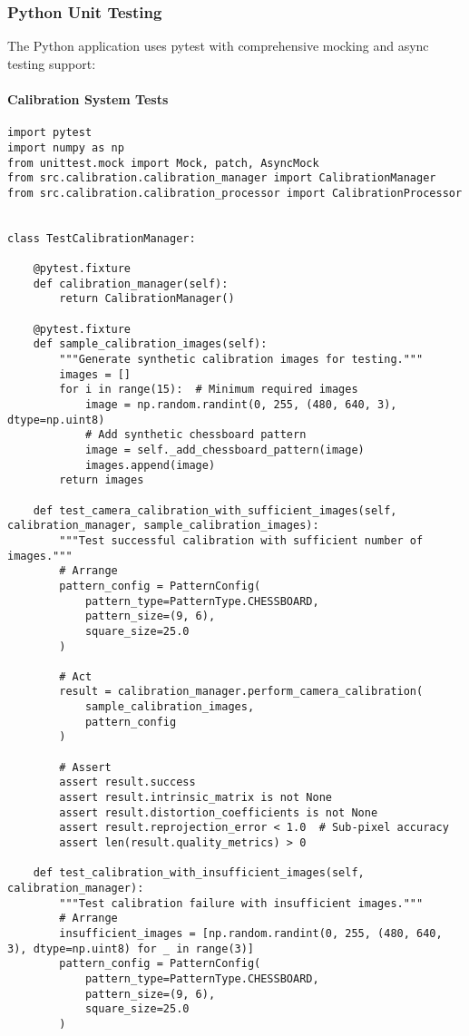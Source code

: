\documentclass[12pt,a4paper]{report}
\begin{document}
\subsubsection{Python Unit Testing}

The Python application uses pytest with comprehensive mocking and async testing support:

\paragraph{Calibration System Tests}

\begin{verbatim}
import pytest
import numpy as np
from unittest.mock import Mock, patch, AsyncMock
from src.calibration.calibration_manager import CalibrationManager
from src.calibration.calibration_processor import CalibrationProcessor


class TestCalibrationManager:

    @pytest.fixture
    def calibration_manager(self):
        return CalibrationManager()

    @pytest.fixture
    def sample_calibration_images(self):
        """Generate synthetic calibration images for testing."""
        images = []
        for i in range(15):  # Minimum required images
            image = np.random.randint(0, 255, (480, 640, 3), dtype=np.uint8)
            # Add synthetic chessboard pattern
            image = self._add_chessboard_pattern(image)
            images.append(image)
        return images

    def test_camera_calibration_with_sufficient_images(self, calibration_manager, sample_calibration_images):
        """Test successful calibration with sufficient number of images."""
        # Arrange
        pattern_config = PatternConfig(
            pattern_type=PatternType.CHESSBOARD,
            pattern_size=(9, 6),
            square_size=25.0
        )

        # Act
        result = calibration_manager.perform_camera_calibration(
            sample_calibration_images,
            pattern_config
        )

        # Assert
        assert result.success
        assert result.intrinsic_matrix is not None
        assert result.distortion_coefficients is not None
        assert result.reprojection_error < 1.0  # Sub-pixel accuracy
        assert len(result.quality_metrics) > 0

    def test_calibration_with_insufficient_images(self, calibration_manager):
        """Test calibration failure with insufficient images."""
        # Arrange
        insufficient_images = [np.random.randint(0, 255, (480, 640, 3), dtype=np.uint8) for _ in range(3)]
        pattern_config = PatternConfig(
            pattern_type=PatternType.CHESSBOARD,
            pattern_size=(9, 6),
            square_size=25.0
        )


\end{verbatim}
\end{document}
